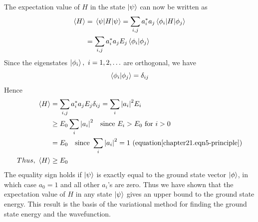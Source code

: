 	The expectation value of $H$ in the state $\ket{\psi}$ can now be written as 
	\begin{align*}
		\expval{H} &= \expval{H}{\psi} = \sum_{i,j} a^*_i a_j \mel{\phi_i}{H}{\phi_j}\\
		&=  \sum_{i,j} a^*_i a_j E_j \braket{\phi_i}{\phi_j}
	\end{align*}
	Since the eigenstates $\ket{\phi_i},\ i=1,2,\ldots$ are orthogonal, we have
	\begin{equation*}
		\braket{\phi_i}{\phi_j} = \delta_{i j}
	\end{equation*}
	Hence
	\begin{align*}
		\expval{H} &= \sum_{i,j} a^*_i a_j E_j \delta_{i j} = \sum_{i} \abs{a_i}^2 E_i \\
		&\geq E_0 \sum_{i} \abs{a_i}^2 \quad \text{since } E_i > E_0 \ \text{for} \ i>0 \\
		&= E_0 \quad \text{since } \sum_{i} \abs{a_i}^2=1 \  (\text{equation} \ref{chapter21.eqn5-principle})\\
		Thus, \ \expval{H} &\geq E_0
	\end{align*}
	The equality sign holds if $\ket{\psi}$ is exactly equal to the ground state vector $\ket{\phi}$, in which case $a_0=1$ and all other $a_i$'s are zero. Thus we have shown that the expectation value of $H$ in any state $\ket{\psi}$ gives an upper bound to the ground state energy. This result is the basis of the variational method for finding the ground state energy and the wavefunction.
	
